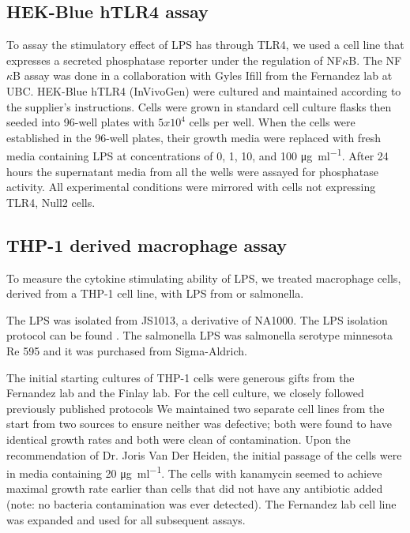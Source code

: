 \subsection{HEK-Blue hTLR4 assay}\label{sec:hek-blue-htlr4}
To assay the stimulatory effect of \caulobacter{} \ac{LPS}  has through TLR4, we used a cell line that expresses a secreted phosphatase reporter under the regulation of NF$\kappa$B.
The NF$\kappa$B assay was done in a collaboration with Gyles Ifill from the Fernandez lab at UBC. HEK-Blue hTLR4\texttrademark{} (InVivoGen) were cultured and maintained according to the supplier's instructions. Cells were grown in standard cell culture flasks then seeded into 96-well plates with $5x10^{4}$ cells per well. When the cells were established in the 96-well plates, their growth media were replaced with fresh media containing \ac{LPS} at concentrations of 0, 1, 10, and 100 \si{\micro\gram\per\milli\litre}. After 24 hours the supernatant media from all the wells were assayed for phosphatase activity. All experimental conditions were mirrored with cells not expressing TLR4, Null2 cells\texttrademark{}.
      
\subsection{THP-1 derived macrophage assay} \label{sec:thp-1-derived}
To measure the cytokine stimulating ability of \caulobacter{} \ac{LPS}, we treated macrophage cells, derived from a THP-1 cell line, with \ac{LPS} from \caulobacter{} or \ac{salmonella}. 
      
The \caulobacter{} \ac{LPS} was isolated from \caulobacter{} JS1013, a derivative of NA1000. The \ac{LPS} isolation protocol can be found . The \ac{salmonella} \ac{LPS} was \ac{salmonella} serotype minnesota Re 595 and it was purchased from Sigma-Aldrich.
      
The initial starting cultures of THP-1 cells were generous gifts from the Fernandez lab and the Finlay lab. For the cell culture, we closely followed previously published protocols We maintained two separate cell lines from the start from two sources to ensure neither was defective; both were found to have identical growth rates and both were clean of contamination. Upon the recommendation of Dr. Joris Van Der Heiden, the initial passage of the cells were in media containing 20 \si{\micro\gram\per\milli\litre}. The cells with kanamycin seemed to achieve maximal growth rate earlier than cells that did not have any antibiotic added (note: no bacteria contamination was ever detected). The Fernandez lab cell line was expanded and used for all subsequent assays.
      
